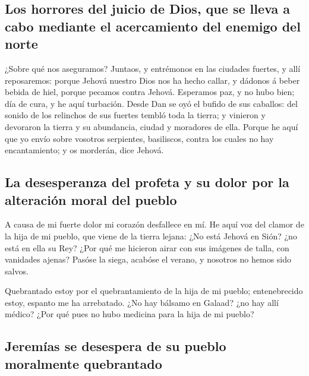 \hypertarget{los-horrores-del-juicio-de-dios-que-se-lleva-a-cabo-mediante-el-acercamiento-del-enemigo-del-norte}{%
\subsection{Los horrores del juicio de Dios, que se lleva a cabo
mediante el acercamiento del enemigo del
norte}\label{los-horrores-del-juicio-de-dios-que-se-lleva-a-cabo-mediante-el-acercamiento-del-enemigo-del-norte}}

 ¿Sobre qué nos aseguramos? Juntaos, y entrémonos en las
ciudades fuertes, y allí reposaremos: porque Jehová nuestro Dios nos ha
hecho callar, y dádonos á beber bebida de hiel, porque pecamos contra
Jehová.  Esperamos paz, y no hubo bien; día de cura, y he
aquí turbación.  Desde Dan se oyó el bufido de sus
caballos: del sonido de los relinchos de sus fuertes tembló toda la
tierra; y vinieron y devoraron la tierra y su abundancia, ciudad y
moradores de ella.  Porque he aquí que yo envío sobre
vosotros serpientes, basiliscos, contra los cuales no hay encantamiento;
y os morderán, dice Jehová.

\hypertarget{la-desesperanza-del-profeta-y-su-dolor-por-la-alteraciuxf3n-moral-del-pueblo}{%
\subsection{La desesperanza del profeta y su dolor por la alteración
moral del
pueblo}\label{la-desesperanza-del-profeta-y-su-dolor-por-la-alteraciuxf3n-moral-del-pueblo}}

 A causa de mi fuerte dolor mi corazón desfallece en mí.
 He aquí voz del clamor de la hija de mi pueblo, que
viene de la tierra lejana: ¿No está Jehová en Sión? ¿no está en ella su
Rey? ¿Por qué me hicieron airar con sus imágenes de talla, con vanidades
ajenas?  Pasóse la siega, acabóse el verano, y nosotros
no hemos sido salvos.

 Quebrantado estoy por el quebrantamiento de la hija de
mi pueblo; entenebrecido estoy, espanto me ha arrebatado.
 ¿No hay bálsamo en Galaad? ¿no hay allí médico? ¿Por qué
pues no hubo medicina para la hija de mi pueblo?

\hypertarget{jeremuxedas-se-desespera-de-su-pueblo-moralmente-quebrantado}{%
\subsection{Jeremías se desespera de su pueblo moralmente
quebrantado}\label{jeremuxedas-se-desespera-de-su-pueblo-moralmente-quebrantado}}

